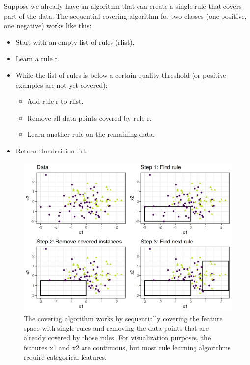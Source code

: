 \documentclass[12pt,]{krantz}
\providecommand{\tightlist}{%
  \setlength{\itemsep}{0pt}\setlength{\parskip}{0pt}}
\begin{document}
Suppose we already have an algorithm that can create a single rule that
covers part of the data. The sequential covering algorithm for two
classes (one positive, one negative) works like this:

\begin{itemize}
\tightlist
\item
  Start with an empty list of rules (rlist).
\item
  Learn a rule r.
\item
  While the list of rules is below a certain quality threshold (or
  positive examples are not yet covered):

  \begin{itemize}
  \tightlist
  \item
    Add rule r to rlist.
  \item
    Remove all data points covered by rule r.
  \item
    Learn another rule on the remaining data.
  \end{itemize}
\item
  Return the decision list.
\end{itemize}

\begin{figure}

{\centering \includegraphics[width=\textwidth]{images/covering-algo-1} 

}

\caption{The covering algorithm works by sequentially covering the feature space with single rules and removing the data points that are already covered by those rules. For visualization purposes, the features x1 and x2 are continuous, but most rule learning algorithms require categorical features.}\label{fig:covering-algo}
\end{figure}
\end{document}
